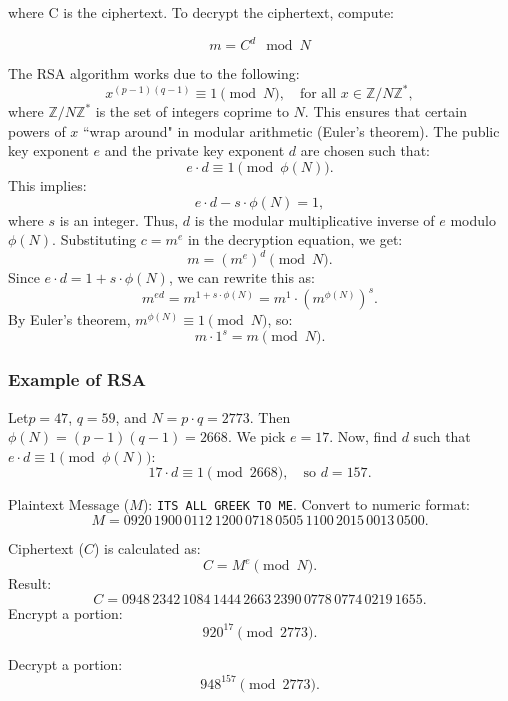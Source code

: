 where C is the ciphertext. To decrypt the ciphertext, compute:

\[ m = C^d \mod N \]

The RSA algorithm works due to the following:
\[
x^{(p-1)(q-1)} \equiv 1 \pmod{N}, \quad \text{for all } x \in \mathbb{Z}/N\mathbb{Z}^*,
\]
where \( \mathbb{Z}/N\mathbb{Z}^* \) is the set of integers coprime to \( N \). This ensures that certain powers of \( x \) ``wrap around" in modular arithmetic (Euler's theorem).
The public key exponent \( e \) and the private key exponent \( d \) are chosen such that:
\[
e \cdot d \equiv 1 \pmod{\phi(N)}.
\]
This implies:
\[
e \cdot d - s \cdot \phi(N) = 1,
\]
where \( s \) is an integer. Thus, \( d \) is the modular multiplicative inverse of \( e \) modulo \( \phi(N) \).
Substituting \( c = m^e \) in the decryption equation, we get:
\[
m = (m^e)^d \pmod{N}.
\]
Since \( e \cdot d = 1 + s \cdot \phi(N) \), we can rewrite this as:
\[
m^{ed} = m^{1 + s \cdot \phi(N)} = m^1 \cdot (m^{\phi(N)})^s.
\]
By Euler's theorem, \( m^{\phi(N)} \equiv 1 \pmod{N} \), so:
\[
m \cdot 1^s = m \pmod{N}.
\]

\subsubsection{Example of RSA}

Let\( p = 47 \), \( q = 59 \), and \( N = p \cdot q = 2773 \). Then \( \phi(N) = (p-1)(q-1) = 2668 \). We pick \( e = 17 \).
Now, find \( d \) such that \( e \cdot d \equiv 1 \pmod{\phi(N)} \): 
    \[
    17 \cdot d \equiv 1 \pmod{2668}, \quad \text{so } d = 157.
    \]

 Plaintext Message (\( M \)): \texttt{ITS ALL GREEK TO ME}. Convert to numeric format:
    \[
    M = 0920 \, 1900 \, 0112 \, 1200 \, 0718 \, 0505 \, 1100 \, 2015 \, 0013 \, 0500.
    \]

Ciphertext (\( C \)) is calculated as:
    \[
    C = M^e \pmod{N}.
    \]
Result:
    \[
    C = 0948 \, 2342 \, 1084 \, 1444 \, 2663 \, 2390 \, 0778 \, 0774 \, 0219 \, 1655.
    \]
Encrypt a portion: 
    \[
    920^{17} \pmod{2773}.
    \]
    
Decrypt a portion:
    \[
    948^{157} \pmod{2773}.
    \]


